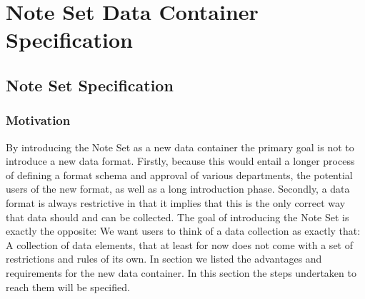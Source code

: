 \chapter{Note Set Data Container Specification}
\label{chap:technicaldocu}

\section{Note Set Specification}
\subsection{Motivation}
By introducing the Note Set as a new data container the primary goal is not to introduce a new data format. Firstly, because this would entail a longer process of defining a format schema and approval of various departments, the potential users of the new format, as well as a long introduction phase. Secondly, a data format is always restrictive in that it implies that this is the only correct way that data should and can be collected. The goal of introducing the Note Set is exactly the opposite: We want users to think of a data collection as exactly that: A collection of data elements, that at least for now does not come with a set of restrictions and rules of its own. In section  we listed the advantages and requirements for the new data container. In this section the steps undertaken to reach them will be specified.
